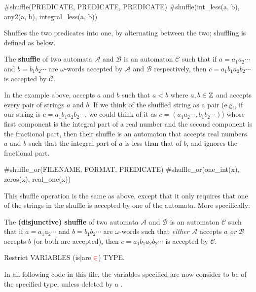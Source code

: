 \begin{pecan}
#shuffle(PREDICATE, PREDICATE, PREDICATE)
#shuffle(int_less(a, b), any2(a, b), integral_less(a, b))
\end{pecan}

Shuffles the two predicates into one, by alternating between the two; shuffling is defined as below.

\begin{definition}
    The \textbf{shuffle} of two automata $\mathcal{A}$ and $\mathcal{B}$ is an automaton $\mathcal{C}$ such that if $a = a_1 a_2 \cdots$ and $b = b_1 b_2 \cdots$ are $\omega$-words accepted by $\mathcal{A}$ and $\mathcal{B}$ respectively, then $c = a_1 b_1 a_2 b_2 \cdots$ is accepted by $\mathcal{C}$.
\end{definition}

In the example above,  accepts $a$ and $b$ such that $a < b$ where $a, b \in \mathbb{Z}$ and  accepts every pair of strings $a$ and $b$.
If we think of the shuffled string as a pair (e.g., if our string is $c = a_1 b_1 a_2 b_2 \cdots$, we could think of it as $c = (a_1 a_2 \cdots, b_1 b_2 \cdots)$) whose first component is the integral part of a real number and the second component is the fractional part, then their shuffle is an automaton that accepts real numbers $a$ and $b$ such that the integral part of $a$ is less than that of $b$, and ignores the fractional part.

\begin{pecan}
#shuffle_or(FILENAME, FORMAT, PREDICATE)
#shuffle_or(one_int(x), zeros(x), real_one(x))
\end{pecan}

This shuffle operation is the same as above, except that it only requires that one of the strings in the shuffle is accepted by one of the automata.
More specifically:

\begin{definition}
    The \textbf{(disjunctive) shuffle} of two automata $\mathcal{A}$ and $\mathcal{B}$ is an automaton $\mathcal{C}$ such that if $a = a_1 a_2 \cdots$ and $b = b_1 b_2 \cdots$ are $\omega$-words such that \emph{either} $\mathcal{A}$ accepts $a$ \emph{or} $\mathcal{B}$ accepts $b$ (or both are accepted), then $c = a_1 b_1 a_2 b_2 \cdots$ is accepted by $\mathcal{C}$.
\end{definition}

\begin{pecan}
Restrict VARIABLES (is|are|$\color{red} \in$) TYPE.
\end{pecan}

In all following code in this file, the variables specified are now consider to be of the specified type, unless deleted by a .
